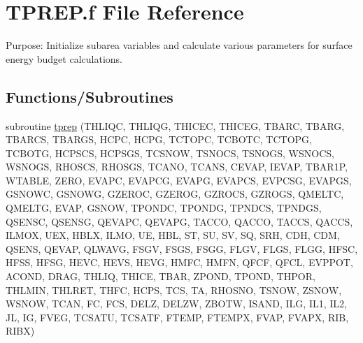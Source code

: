 \hypertarget{TPREP_8f}{}\section{T\+P\+R\+E\+P.\+f File Reference}
\label{TPREP_8f}


Purpose\+: Initialize subarea variables and calculate various parameters for surface energy budget calculations.  


\subsection*{Functions/\+Subroutines}
\begin{DoxyCompactItemize}
\item 
subroutine \hyperlink{TPREP_8f_a7e4916d23e9c1a0300f168e58bbf7ae4}{tprep} (T\+H\+L\+I\+Q\+C, T\+H\+L\+I\+Q\+G, T\+H\+I\+C\+E\+C, T\+H\+I\+C\+E\+G, T\+B\+A\+R\+C, T\+B\+A\+R\+G, T\+B\+A\+R\+C\+S, T\+B\+A\+R\+G\+S, H\+C\+P\+C, H\+C\+P\+G, T\+C\+T\+O\+P\+C, T\+C\+B\+O\+T\+C, T\+C\+T\+O\+P\+G, T\+C\+B\+O\+T\+G, H\+C\+P\+S\+C\+S, H\+C\+P\+S\+G\+S, T\+C\+S\+N\+O\+W, T\+S\+N\+O\+C\+S, T\+S\+N\+O\+G\+S, W\+S\+N\+O\+C\+S, W\+S\+N\+O\+G\+S, R\+H\+O\+S\+C\+S, R\+H\+O\+S\+G\+S, T\+C\+A\+N\+O, T\+C\+A\+N\+S, C\+E\+V\+A\+P, I\+E\+V\+A\+P, T\+B\+A\+R1\+P, W\+T\+A\+B\+L\+E, Z\+E\+R\+O, E\+V\+A\+P\+C, E\+V\+A\+P\+C\+G, E\+V\+A\+P\+G, E\+V\+A\+P\+C\+S, E\+V\+P\+C\+S\+G, E\+V\+A\+P\+G\+S, G\+S\+N\+O\+W\+C, G\+S\+N\+O\+W\+G, G\+Z\+E\+R\+O\+C, G\+Z\+E\+R\+O\+G, G\+Z\+R\+O\+C\+S, G\+Z\+R\+O\+G\+S, Q\+M\+E\+L\+T\+C, Q\+M\+E\+L\+T\+G, E\+V\+A\+P, G\+S\+N\+O\+W, T\+P\+O\+N\+D\+C, T\+P\+O\+N\+D\+G, T\+P\+N\+D\+C\+S, T\+P\+N\+D\+G\+S, Q\+S\+E\+N\+S\+C, Q\+S\+E\+N\+S\+G, Q\+E\+V\+A\+P\+C, Q\+E\+V\+A\+P\+G, T\+A\+C\+C\+O, Q\+A\+C\+C\+O, T\+A\+C\+C\+S, Q\+A\+C\+C\+S, I\+L\+M\+O\+X, U\+E\+X, H\+B\+L\+X, I\+L\+M\+O, U\+E, H\+B\+L, S\+T, S\+U, S\+V, S\+Q, S\+R\+H, C\+D\+H, C\+D\+M, Q\+S\+E\+N\+S, Q\+E\+V\+A\+P, Q\+L\+W\+A\+V\+G, F\+S\+G\+V, F\+S\+G\+S, F\+S\+G\+G, F\+L\+G\+V, F\+L\+G\+S, F\+L\+G\+G, H\+F\+S\+C, H\+F\+S\+S, H\+F\+S\+G, H\+E\+V\+C, H\+E\+V\+S, H\+E\+V\+G, H\+M\+F\+C, H\+M\+F\+N, Q\+F\+C\+F, Q\+F\+C\+L, E\+V\+P\+P\+O\+T, A\+C\+O\+N\+D, D\+R\+A\+G, T\+H\+L\+I\+Q, T\+H\+I\+C\+E, T\+B\+A\+R, Z\+P\+O\+N\+D, T\+P\+O\+N\+D, T\+H\+P\+O\+R, T\+H\+L\+M\+I\+N, T\+H\+L\+R\+E\+T, T\+H\+F\+C, H\+C\+P\+S, T\+C\+S, T\+A, R\+H\+O\+S\+N\+O, T\+S\+N\+O\+W, Z\+S\+N\+O\+W, W\+S\+N\+O\+W, T\+C\+A\+N, F\+C, F\+C\+S, D\+E\+L\+Z, D\+E\+L\+Z\+W, Z\+B\+O\+T\+W, I\+S\+A\+N\+D, I\+L\+G, I\+L1, I\+L2, J\+L, I\+G, F\+V\+E\+G, T\+C\+S\+A\+T\+U, T\+C\+S\+A\+T\+F, F\+T\+E\+M\+P, F\+T\+E\+M\+P\+X, F\+V\+A\+P, F\+V\+A\+P\+X, R\+I\+B, R\+I\+B\+X)
\end{DoxyCompactItemize}


